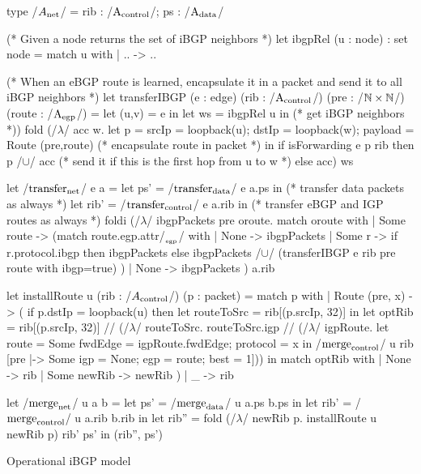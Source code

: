 \documentclass[sigconf,10pt]{acmart}
\begin{document}
\begin{listing}[ht]
  \begin{ocamlcode}
    type /$A_{\net}$/ = { rib : /$\A_{\control}$/; ps : /$\A_{\data}$/ }

    (* Given a node returns the set of iBGP neighbors *)
    let ibgpRel (u : node) : set node =
      match u with
      | .. -> {..}

    (* When an eBGP route is learned, encapsulate it in a packet and send it to all iBGP
       neighbors *)
    let transferIBGP (e : edge) (rib : /$\A_{\control}$/) (pre : /$\nat \times \nat$/) (route : /$\A_{\egp}$/) =
      let (u,v) = e in
      let ws = ibgpRel u in (* get iBGP neighbors *))
      fold (/$\lambda$/ acc w.
        let p = { srcIp = loopback(u);
                     dstIp = loopback(w);
                     payload = Route (pre,route) } (* encapsulate route in packet *)
        in
        if isForwarding e p rib then
          {p} /$\cup$/ acc (* send it if this is the first hop from u to w *)
        else
          acc) {} ws
      
    let /$\transfer_{\net}$/ e a =
      let ps' = /$\transfer_{\data}$/ e a.ps in (* transfer data packets as always *)
      let rib' = /$\transfer_{\control}$/ e a.rib in (* transfer eBGP and IGP routes as always *)
      foldi (/$\lambda$/ ibgpPackets pre oroute.
        match oroute with
        | Some route ->
          (match route.egp.attr/$_{_\egp}$/ with
           | None -> ibgpPackets
           | Some r ->
             if r.protocol.ibgp then
               ibgpPackets
             else
             ibgpPackets /$\cup$/ (transferIBGP e rib pre {route with ibgp=true})
            )
        | None ->
          ibgpPackets     
          ) {} a.rib

    let installRoute u (rib : /$A_{\control}$/) (p : packet) =
      match p with
      | Route (pre, x) -> (
        if p.dstIp = loopback(u) then
          let routeToSrc = rib[(p.srcIp, 32)] in
          let optRib =
            rib[(p.srcIp, 32)] /\bind/
              (/$\lambda$/ routeToSrc.
                routeToSrc.igp /\bind/
                  (/$\lambda$/ igpRoute. 
                    let route = Some { fwdEdge = igpRoute.fwdEdge; protocol = x  } in
                    /$\merge_{\control}$/ u rib [pre |-> Some {igp = None; egp = route; best = 1}]))
          in
          match optRib with
          | None -> rib
          | Some newRib -> newRib
        )
      | _ -> rib  
          
    let /$\merge_{\net}$/ u a b =
      let ps' = /$\merge_{\data}$/ u a.ps b.ps in
      let rib' = /$\merge_{\control}$/ u a.rib b.rib in
      let rib'' = fold (/$\lambda$/ newRib p. installRoute u newRib p) rib' ps' in
      (rib'', ps')
\end{ocamlcode}
\caption{Operational iBGP model}
\label{lst:ibgp-model}
\end{listing}
\end{document}

